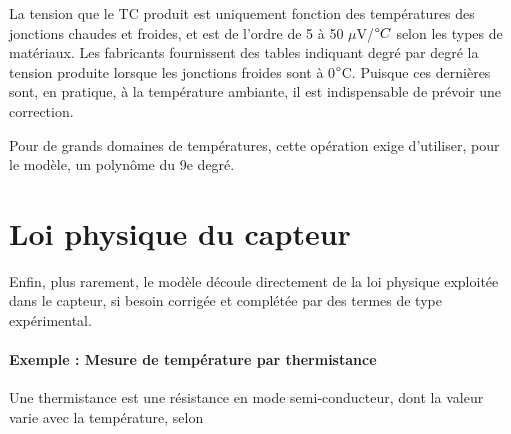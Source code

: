 \documentclass[main.tex]{subfiles}
\begin{document}
La tension que le TC produit est uniquement fonction des températures des jonctions chaudes et froides, et est de l'ordre de 5 à 50 $\mu$V/$\degree C$ selon les types de matériaux. Les fabricants fournissent des tables indiquant degré par degré la tension produite lorsque les jonctions froides sont à 0$\degree$C. Puisque ces dernières sont, en pratique, à la température ambiante, il est indispensable de prévoir une correction.


Pour de grands domaines de températures, cette opération exige d'utiliser, pour le modèle, un polynôme du 9e degré.


\section{Loi physique du capteur}

Enfin, plus rarement, le modèle découle directement de la loi physique exploitée dans le capteur, si besoin corrigée et complétée par des termes de type expérimental.

\paragraph{Exemple : Mesure de température par thermistance}

Une thermistance est une résistance en mode semi-conducteur, dont la valeur varie avec la température, selon
\end{document}
